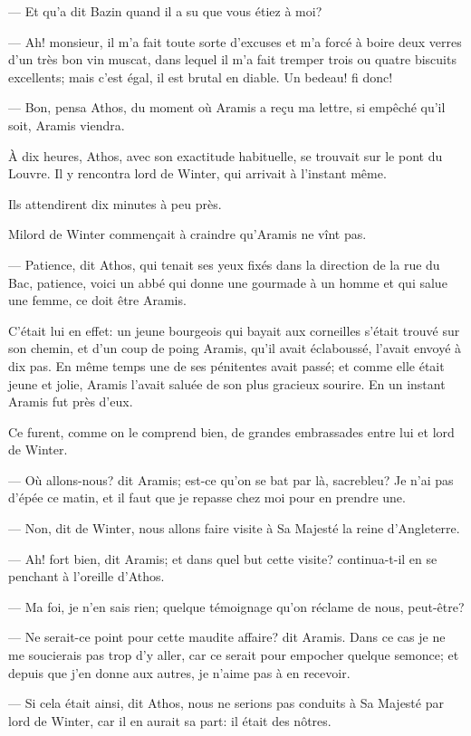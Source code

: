 — Et qu'a dit Bazin quand il a su que vous étiez à moi?

— Ah! monsieur, il m'a fait toute sorte d'excuses et m'a forcé à boire deux verres d'un très bon vin muscat, dans lequel il m'a fait tremper trois ou quatre biscuits excellents; mais c'est égal, il est brutal en diable. Un bedeau! fi donc!

— Bon, pensa Athos, du moment où Aramis a reçu ma lettre, si empêché qu'il soit, Aramis viendra.

À dix heures, Athos, avec son exactitude habituelle, se trouvait sur le pont du Louvre. Il y rencontra lord de Winter, qui arrivait à l'instant même.

Ils attendirent dix minutes à peu près.

Milord de Winter commençait à craindre qu'Aramis ne vînt pas.

— Patience, dit Athos, qui tenait ses yeux fixés dans la direction de la rue du Bac, patience, voici un abbé qui donne une gourmade à un homme et qui salue une femme, ce doit être Aramis.

C'était lui en effet: un jeune bourgeois qui bayait aux corneilles s'était trouvé sur son chemin, et d'un coup de poing Aramis, qu'il avait éclaboussé, l'avait envoyé à dix pas. En même temps une de ses pénitentes avait passé; et comme elle était jeune et jolie, Aramis l'avait saluée de son plus gracieux sourire. En un instant Aramis fut près d'eux.

Ce furent, comme on le comprend bien, de grandes embrassades entre lui et lord de Winter.

— Où allons-nous? dit Aramis; est-ce qu'on se bat par là, sacrebleu? Je n'ai pas d'épée ce matin, et il faut que je repasse chez moi pour en prendre une.

— Non, dit de Winter, nous allons faire visite à Sa Majesté la reine d'Angleterre.

— Ah! fort bien, dit Aramis; et dans quel but cette visite? continua-t-il en se penchant à l'oreille d'Athos.

— Ma foi, je n'en sais rien; quelque témoignage qu'on réclame de nous, peut-être?

— Ne serait-ce point pour cette maudite affaire? dit Aramis. Dans ce cas je ne me soucierais pas trop d'y aller, car ce serait pour empocher quelque semonce; et depuis que j'en donne aux autres, je n'aime pas à en recevoir.

— Si cela était ainsi, dit Athos, nous ne serions pas conduits à Sa Majesté par lord de Winter, car il en aurait sa part: il était des nôtres.

